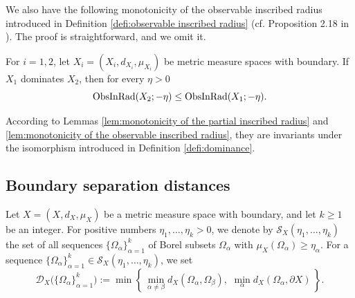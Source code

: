 We also have the following monotonicity of the observable inscribed radius
introduced in Definition \ref{defi:observable inscribed radius} (cf. Proposition 2.18 in \cite{Sh}).
The proof is straightforward,
and we omit it.
\begin{lem}\label{lem:monotonicity of the observable inscribed radius}
For $i=1,2$,
let $X_{i}=(X_{i},d_{X_{i}},\mu_{X_{i}})$ be metric measure spaces with boundary.
If $X_{1}$ dominates $X_{2}$,
then for every $\eta>0$
\begin{equation*}
\operatorname{ObsInRad}(X_{2};-\eta)\leq \operatorname{ObsInRad}(X_{1};-\eta).
\end{equation*}
\end{lem}
According to Lemmas \ref{lem:monotonicity of the partial inscribed radius} and \ref{lem:monotonicity of the observable inscribed radius},
they are invariants under the isomorphism introduced in Definition \ref{defi:dominance}.

\subsection{Boundary separation distances}
Let $X=(X,d_{X},\mu_{X})$ be a metric measure space with boundary,
and let $k\geq 1$ be an integer.
For positive numbers $\eta_{1},\dots,\eta_{k}>0$,
we denote by $\mathcal{S}_{X}(\eta_{1},\dots,\eta_{k})$ the set of all sequences $\{\Omega_{\alpha}\}^{k}_{\alpha=1}$ of Borel subsets $\Omega_{\alpha}$ with $\mu_{X}(\Omega_{\alpha})\geq \eta_{\alpha}$.
For a sequence $\{\Omega_{\alpha}\}^{k}_{\alpha=1} \in \mathcal{S}_{X}(\eta_{1},\dots,\eta_{k})$,
we set
\begin{equation*}
\mathcal{D}_{X}\bigl(\{\Omega_{\alpha}\}^{k}_{\alpha=1}\bigl):=\min \left \{\, \min_{\alpha \neq \beta} d_{X}(\Omega_{\alpha},\Omega_{\beta}),\,\, \min_{\alpha} d_{X}(\Omega_{\alpha},\partial X)  \,\right\}.
\end{equation*}

